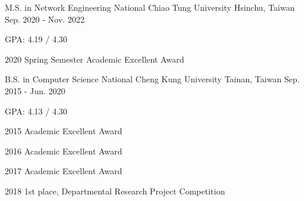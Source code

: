 

\begin{cventries}

  \cventry
    {M.S. in Network Engineering} %
    {National Chiao Tung University} %
    {Hsinchu, Taiwan} %
    {Sep. 2020 - Nov. 2022} %
    {
      \begin{cvitems} %
        \item {GPA: 4.19 / 4.30}
        \item {2020 Spring Semester Academic Excellent Award}
      \end{cvitems}
    }

  \cventry
    {B.S. in Computer Science} %
    {National Cheng Kung University} %
    {Tainan, Taiwan} %
    {Sep. 2015 - Jun. 2020} %
    {
      \begin{cvitems} %
        \item {GPA: 4.13 / 4.30}
        \item {2015 Academic Excellent Award}
        \item {2016 Academic Excellent Award}
        \item {2017 Academic Excellent Award}
        \item {2018 1st place, Departmental Research Project Competition}
      \end{cvitems}
    }

\end{cventries}
